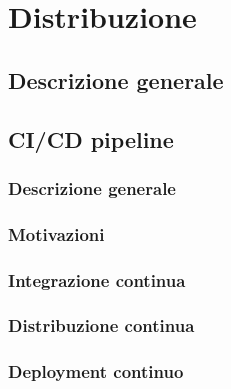 \chapter{Distribuzione}
\section{Descrizione generale}
\kant[5]
\section{CI/CD pipeline}
\subsection{Descrizione generale}
\kant[5]
\subsection{Motivazioni}
\kant[5]
\subsection{Integrazione continua}
\kant[5]
\subsection{Distribuzione continua}
\kant[5]
\subsection{Deployment continuo}
\kant[5]